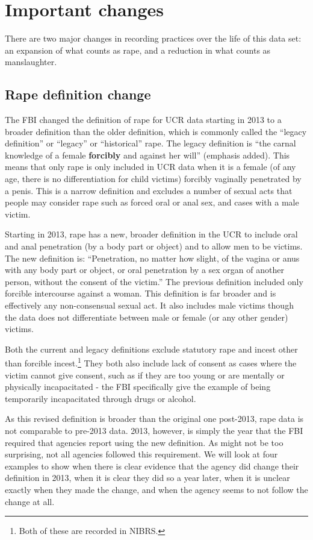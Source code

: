 \documentclass[
]{krantz}
\begin{document}
\section{Important changes}\label{important-changes}

There are two major changes in recording practices over the
life of this data set: an expansion of what counts as rape,
and a reduction in what counts as manslaughter.

\subsection{Rape definition
change}\label{rape-definition-change}

The FBI changed the definition of rape for UCR data starting
in 2013 to a broader definition than the older definition,
which is commonly called the ``legacy definition'' or
``legacy'' or ``historical'' rape. The legacy definition is
``the carnal knowledge of a female \textbf{forcibly} and
against her will'' (emphasis added). This means that only
rape is only included in UCR data when it is a female (of
any age, there is no differentiation for child victims)
forcibly vaginally penetrated by a penis. This is a narrow
definition and excludes a number of sexual acts that people
may consider rape such as forced oral or anal sex, and cases
with a male victim.

Starting in 2013, rape has a new, broader definition in the
UCR to include oral and anal penetration (by a body part or
object) and to allow men to be victims. The new definition
is: ``Penetration, no matter how slight, of the vagina or
anus with any body part or object, or oral penetration by a
sex organ of another person, without the consent of the
victim.'' The previous definition included only forcible
intercourse against a woman. This definition is far broader
and is effectively any non-consensual sexual act. It also
includes male victims though the data does not differentiate
between male or female (or any other gender) victims.

Both the current and legacy definitions exclude statutory
rape and incest other than forcible incest.\footnote{Both of
  these are recorded in NIBRS.} They both also include lack
of consent as cases where the victim cannot give consent,
such as if they are too young or are mentally or physically
incapacitated - the FBI specifically give the example of
being temporarily incapacitated through drugs or alcohol.

As this revised definition is broader than the original one
post-2013, rape data is not comparable to pre-2013 data.
2013, however, is simply the year that the FBI required that
agencies report using the new definition. As might not be
too surprising, not all agencies followed this requirement.
We will look at four examples to show when there is clear
evidence that the agency did change their definition in
2013, when it is clear they did so a year later, when it is
unclear exactly when they made the change, and when the
agency seems to not follow the change at all.
\end{document}
